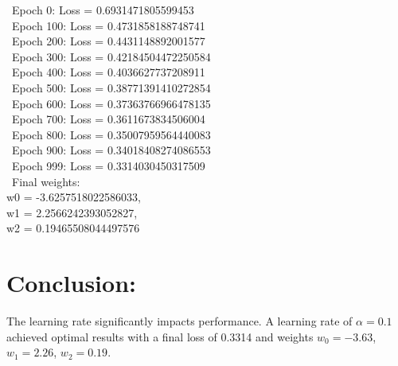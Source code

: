 \documentclass{article}
\begin{document}
\textbullet\ Epoch 0: Loss = 0.6931471805599453\\
\textbullet\  Epoch 100: Loss = 0.4731858188748741\\
\textbullet\ Epoch 200: Loss = 0.4431148892001577\\
\textbullet\ Epoch 300: Loss = 0.42184504472250584\\
\textbullet\ Epoch 400: Loss = 0.4036627737208911\\
\textbullet\ Epoch 500: Loss = 0.38771391410272854\\
\textbullet\ Epoch 600: Loss = 0.37363766966478135\\
\textbullet\ Epoch 700: Loss = 0.3611673834506004\\
\textbullet\ Epoch 800: Loss = 0.35007959564440083\\
\textbullet\ Epoch 900: Loss = 0.34018408274086553\\
\textbullet\ Epoch 999: Loss = 0.3314030450317509\\
\textbullet\ Final weights: \\
w0 = -3.6257518022586033, \\
w1 = 2.2566242393052827, \\
w2 = 0.19465508044497576 \\

\section{Conclusion:}
The learning rate significantly impacts performance. A learning rate of $\alpha = 0.1$ achieved optimal results with a final loss of 0.3314 and weights $w_0 = -3.63$, $w_1 = 2.26$, $w_2 = 0.19$.
\end{document}
